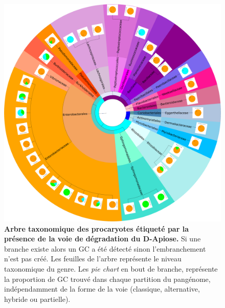 \begin{figure}[htbp] 
    \centering
    \includegraphics[width=\textwidth]{images/phylogenetic_tree_with_pies.png}
    \caption[Arbre taxonomique des procaryotes étiqueté par la présence de la voie de dégradation du D-Apiose]{\textbf{Arbre taxonomique des procaryotes étiqueté par la présence de la voie de dégradation du D-Apiose.} Si une branche existe alors un GC a été détecté sinon l'embranchement n'est pas créé. Les feuilles de l'arbre représente le niveau taxonomique du genre. Les \textit{pie chart} en bout de branche, représente la proportion de GC trouvé dans chaque partition du pangénome, indépendamment de la forme de la voie (classique, alternative, hybride ou partielle).} 
    \label{fig:PhyloTreeApiose}
\end{figure}

